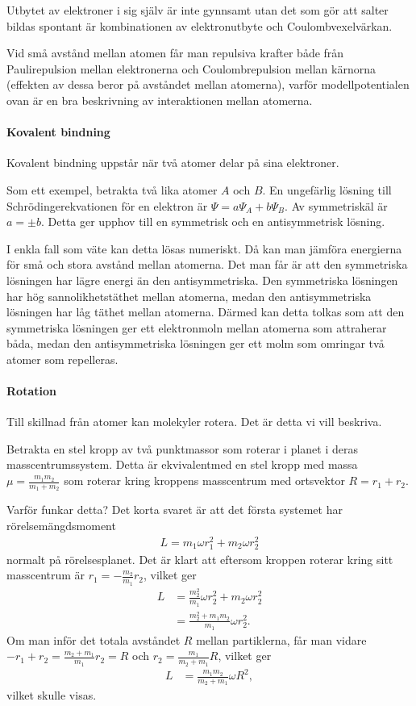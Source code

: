 Utbytet av elektroner i sig själv är inte gynnsamt utan det som gör att salter bildas spontant är kombinationen av elektronutbyte och Coulombvexelvärkan.

Vid små avstånd mellan atomen får man repulsiva krafter både från Paulirepulsion mellan elektronerna och Coulombrepulsion mellan kärnorna (effekten av dessa beror på avståndet mellan atomerna), varför modellpotentialen ovan är en bra beskrivning av interaktionen mellan atomerna.

\paragraph{Kovalent bindning}
Kovalent bindning uppstår när två atomer delar på sina elektroner.

Som ett exempel, betrakta två lika atomer $A$ och $B$. En ungefärlig lösning till Schrödingerekvationen för en elektron är $\Psi = a\Psi_{A} + b\Psi_{B}$. Av symmetriskäl är $a = \pm b$. Detta ger upphov till en symmetrisk och en antisymmetrisk lösning.

I enkla fall som väte kan detta lösas numeriskt. Då kan man jämföra energierna för små och stora avstånd mellan atomerna. Det man får är att den symmetriska lösningen har lägre energi än den antisymmetriska. Den symmetriska lösningen har hög sannolikhetstäthet mellan atomerna, medan den antisymmetriska lösningen har låg täthet mellan atomerna. Därmed kan detta tolkas som att den symmetriska lösningen ger ett elektronmoln mellan atomerna som attraherar båda, medan den antisymmetriska lösningen ger ett molm som omringar två atomer som repelleras.

\paragraph{Rotation}
Till skillnad från atomer kan molekyler rotera. Det är detta vi vill beskriva.

Betrakta en stel kropp av två punktmassor som roterar i planet i deras masscentrumssystem. Detta är ekvivalent\footnotemark med en stel kropp med massa $\mu = \frac{m_{1}m_{2}}{m_{1} + m_{2}}$ som roterar kring kroppens masscentrum med ortsvektor $R = r_{1} + r_{2}$.

Varför funkar detta? Det korta svaret är att det första systemet har rörelsemängdsmoment
\begin{align*}
	L = m_{1}\omega r_{1}^{2} + m_{2}\omega r_{2}^{2}
\end{align*}
normalt på rörelsesplanet. Det är klart att eftersom kroppen roterar kring sitt masscentrum är $r_{1} = -\frac{m_{2}}{m_{1}}r_{2}$, vilket ger
\begin{align*}
	L &= \frac{m_{2}^{2}}{m_{1}}\omega r_{2}^{2} + m_{2}\omega r_{2}^{2} \\
	  &= \frac{m_{2}^{2} + m_{1}m_{2}}{m_{1}}\omega r_{2}^{2}.
\end{align*}
Om man inför det totala avståndet $R$ mellan partiklerna, får man vidare $-r_{1} + r_{2} = \frac{m_{2} + m_{1}}{m_{1}}r_{2} = R$ och $r_{2} = \frac{m_{1}}{m_{2} + m_{1}}R$, vilket ger
\begin{align*}
	L &= \frac{m_{1}m_{2}}{m_{2} + m_{1}}\omega R^{2},
\end{align*}
vilket skulle visas.

